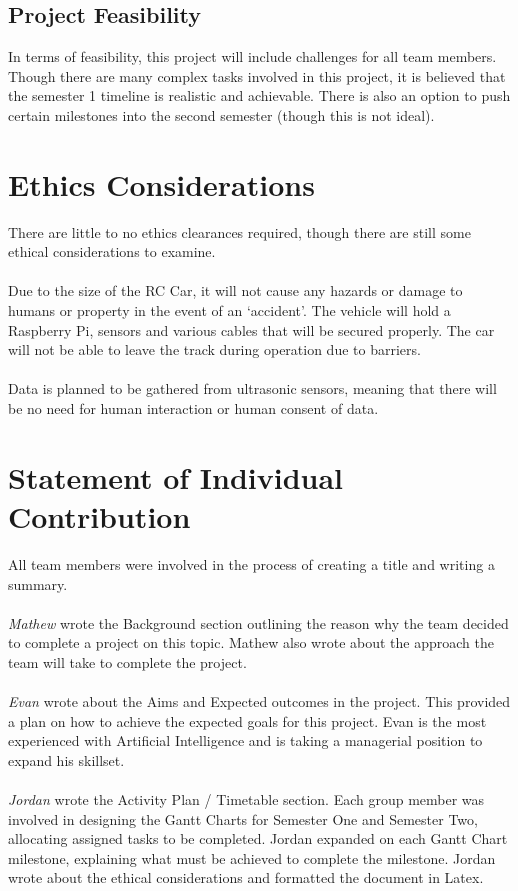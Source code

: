 \documentclass[8pt]{article}
\begin{document}
\subsection{Project Feasibility}
In terms of feasibility, this project will include challenges for all team members. Though there are many complex tasks involved in this project, it is believed that the semester 1 timeline  is realistic and achievable. There is also an option to push certain milestones into the second semester (though this is not ideal).

\newpage

\section{Ethics Considerations}
There are little to no ethics clearances required, though there are still some ethical considerations to examine.
\\\\
Due to the size of the RC Car, it will not cause any hazards or damage to humans or property in the event of an ‘accident’. The vehicle will hold a Raspberry Pi, sensors and various cables that will be secured properly. The car will not be able to leave the track during operation due to barriers. 
\\\\
Data is planned to be gathered from ultrasonic sensors, meaning that there will be no need for human interaction or human consent of data.

\section{Statement of Individual Contribution}
All team members were involved in the process of creating a title and writing a summary.
\\\\
\emph{Mathew} wrote the Background section outlining the reason why the team decided to complete a project on this topic. Mathew also wrote about the approach the team will take to complete the project.
\\\\
\emph{Evan} wrote about the Aims and Expected outcomes in the project. This provided a plan on how to achieve the expected goals for this project. Evan is the most experienced with Artificial Intelligence and is taking a managerial position to expand his skillset.
\\\\
\emph{Jordan} wrote the Activity Plan / Timetable section. Each group member was involved in designing the Gantt Charts for Semester One and Semester Two, allocating assigned tasks to be completed. Jordan expanded on each Gantt Chart milestone, explaining what must be achieved to complete the milestone. Jordan wrote about the ethical considerations and formatted the document in Latex.
\end{document}
